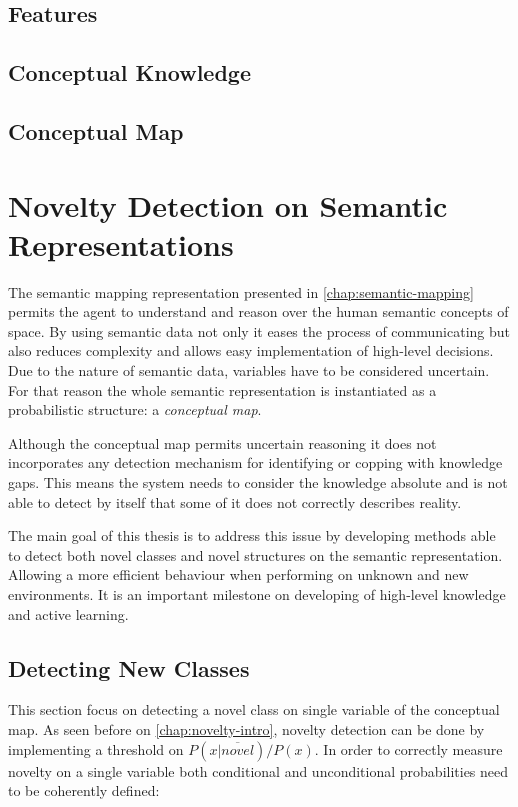 \section{Features}
\section{Conceptual Knowledge}
\section{Conceptual Map}



\chapter{Novelty Detection on Semantic Representations}\label{chap:novelty}
The semantic mapping representation presented in \autoref{chap:semantic-mapping}
permits the agent to understand and reason over the human semantic concepts of
space. By using semantic data not only it eases the process of communicating 
but also reduces complexity and allows easy implementation of high-level
decisions.
Due to the nature of semantic data, variables have to be considered
uncertain. For that reason the whole semantic representation is instantiated
as a probabilistic structure: a \emph{conceptual map}. 

Although the conceptual map permits uncertain reasoning it does not incorporates
any detection mechanism for identifying or copping with knowledge gaps.
This means the system needs to consider the knowledge absolute and is not
able to detect by itself that some of it does not correctly describes reality. 

The main goal of this thesis is to address this issue by developing methods
able to detect both novel classes and novel structures on the semantic
representation. Allowing a more efficient behaviour when performing on unknown
and new environments. It is an important milestone on developing of high-level
knowledge and active learning.


\section{Detecting New Classes}
This section focus on detecting a novel class on single variable of the
conceptual map. As seen before on \autoref{chap:novelty-intro},
novelty detection can be done by implementing a threshold on
$P(x|\overline{novel})/P(x)$.
In order to correctly measure novelty on a single variable both
conditional and unconditional probabilities need to be coherently defined:


